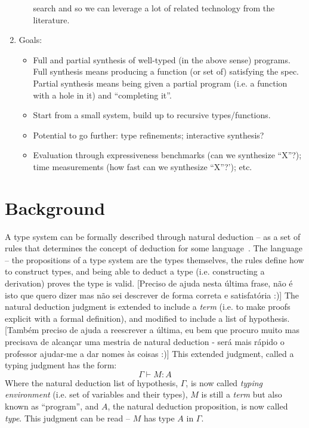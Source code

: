 \documentclass{llncs}
\newcommand{\tensor}{\otimes}
\begin{document}
\begin{enumerate}
\begin{itemize}
    search and so we can leverage a lot of related technology from the
    literature.
  \end{itemize}
\item Goals:
  \begin{itemize}
\item Full and partial synthesis of well-typed (in the above sense)
  programs. Full synthesis means producing a function (or set of)
  satisfying the spec. Partial synthesis means being given a partial
  program (i.e. a function with a hole in it) and ``completing it''.
\item Start from a small system, build up to recursive
  types/functions.
\item Potential to go further: type refinements; interactive
  synthesis?
 \item Evaluation through expressiveness benchmarks (can we synthesize
   ``X''?); time measurements (how fast can we synthesize ``X''?');
   etc.
  \end{itemize}
   
\end{enumerate}

\section{Background}

A type system can be formally described through natural deduction -- as a set of rules that determines the concept of deduction for some language~\cite{prawitznd65}.
The language -- the propositions of a type system are the types themselves, the rules define how to construct types, and being able to deduct a type (i.e. constructing a derivation) proves the type is valid.
[Preciso de ajuda nesta última frase, não é isto que quero dizer mas não sei descrever de forma correta e satisfatória :)]
The natural deduction judgment is extended to include a \emph{term} (i.e. to make proofs explicit with a formal definition), and modified to include a list of hypothesis.
[Também preciso de ajuda a reescrever a última, eu bem que procuro muito mas precisava de alcançar uma mestria de natural deduction - será mais rápido o professor ajudar-me a dar nomes às coisas :)]
This extended judgment, called a typing judgment has the form:
\[
    \Gamma \vdash M : A
\]
Where the natural deduction list of hypothesis, $\Gamma$, is now called \emph{typing environment} (i.e. set of variables and their types), $M$ is still a \emph{term} but also known as ``program'', and $A$, the natural deduction proposition, is now called \emph{type}. This judgment can be read -- $M$ has type $A$ in $\Gamma$.
\end{document}
